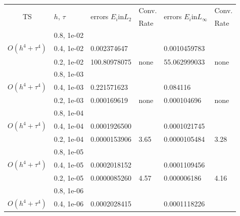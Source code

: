 \documentclass[%
 aip,
cp,  
 amsmath,amssymb,
 reprint,
]{iopconfser}
\begin{document}

\begin{table}[ht]
\centering
\small
		\begin{tabular}{||c|l|ll|ll||}
			\hline
			\hline
      \multirow{2  }{*}{TS}        & \multirow{2  }{*}{$h$, $\tau$}  & \multirow{2  }{*}{errors $E_i$in$L_2$}  &Conv.& \multirow{2  }{*}{errors $E_i$in$L_\infty$}  &Conv.  \\
	         &                    &                               & Rate   &                                        & Rate \\
   			\hline 
					\hline 
                    &0.8, 1e-02          &              &              &                     &      \\
 $O(h^4 + \tau^ 4)$  &0.4, 1e-02          &0.002374647 &            &0.0010459783     &       \\
                     &0.2, 1e-02  & 100.80978075  & none    &55.062999033 &      none      \\
			\hline 
                    &0.8, 1e-03          &              &              &                     &      \\
$O(h^4 + \tau^ 4)$    &0.4, 1e-03          &0.221571623 &            & 0.084116     &       \\
                    &0.2, 1e-03  & 0.000169619  & none   &0.000104696 &     none      \\
			\hline
                    &0.8, 1e-04          &              &              &                     &      \\
     $O(h^4 + \tau^ 4)$  &0.4, 1e-04          &0.0001926500 &            & 0.0001021745    &       \\
                    &0.2, 1e-04  & 0.0000153906  & 3.65   &0.0000105484 &     3.28      \\
    \hline
                    &0.8, 1e-05          &              &              &                     &      \\
     $O(h^4 + \tau^ 4)$   &0.4, 1e-05          &0.0002018152 &            & 0.0001109456    &       \\
                    &0.2, 1e-05  & 0.0000085260 & 4.57   &0.000006186 &      4.16      \\
    \hline
                    &0.8, 1e-06          &              &              &                     &      \\
     $O(h^4 + \tau^ 4)$ &0.4, 1e-06          &0.0002028415 &            & 0.0001118226    &       \\

\end{tabular}
\end{table}
\end{document}
